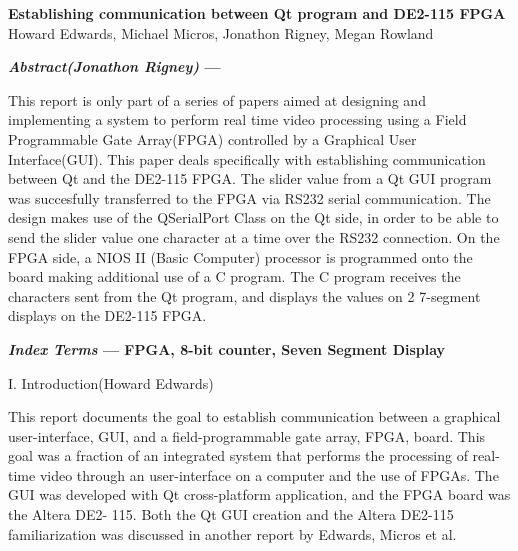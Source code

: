 \documentclass{article}
\begin{document}
\begin{center}

\vspace* {15 pt}
\Huge{\bf Establishing communication between Qt program and DE2-115 FPGA }\\
\vspace {20 pt}
\large{Howard Edwards, Michael Micros, Jonathon  Rigney, Megan Rowland \\}

\end{center}

\vspace{15 pt}




\begin{multicols*}{2}

{\bf  \textit {Abstract(Jonathon Rigney)} ---}
\par This report is only part of a series of papers aimed at designing and implementing a system to perform real time video processing using a Field Programmable Gate Array(FPGA) controlled by a Graphical User Interface(GUI). This paper deals specifically with establishing communication between Qt and the DE2-115 FPGA. The slider value from a Qt GUI program was succesfully transferred to the FPGA via RS232 serial communication. The design makes use of the QSerialPort Class on the Qt side, in order to be able to send the slider value one character at a time over the RS232 connection. On the FPGA side, a NIOS II (Basic Computer) processor is programmed onto the board making additional use of a C program. The C program receives the characters sent from the Qt program, and displays the values on 2 7-segment displays on the DE2-115 FPGA.


{\bf  \textit {Index Terms} --- FPGA, 8-bit counter, Seven Segment Display}




\begin{center}
\large{I. Introduction(Howard Edwards)}
\end{center}
\par This report documents the goal to establish communication between a graphical user-interface, GUI, and a field-programmable gate array, FPGA,  board. This goal was a fraction of an integrated system that performs the processing of real-time video through an user-interface on a computer and the use of FPGAs. The GUI was developed with Qt cross-platform application, and the FPGA board was the Altera DE2- 115. Both the Qt GUI creation and the Altera DE2-115 familiarization was discussed in another report by Edwards, Micros et al.


\end{multicols*}
\end{document}
